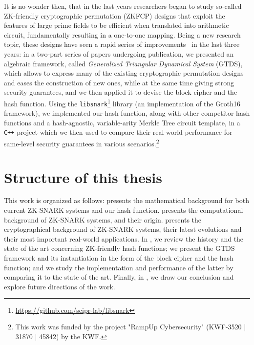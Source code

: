 It is no wonder then, that in the last years researchers began to study so-called ZK-friendly 
cryptographic permutation (ZKFCP) designs that exploit the features of large prime fields to be 
efficient when translated into arithmetic circuit, fundamentally resulting in a one-to-one mapping.
Being a new research topic, these designs have seen a rapid series of 
improvements~\cite{AlbrechtGRRT2016,GrassiKRRS2021,GrassiHRSWW2022} in the last three years:
in a two-part series of papers undergoing publication, we presented an algebraic 
framework, called \emph{Generalized Triangular Dynamical System} (GTDS), which allows to express
many of the existing cryptographic permutation designs and eases the construction of new ones, while
at the same time giving strong security guarantees, and we then applied it to devise the \Arion{}
block cipher and the \Arionhash{} hash function.
Using the \texttt{libsnark}\footnote{\url{https://github.com/scipr-lab/libsnark}} library (an 
implementation of the Groth16 framework), we implemented our hash function, along with other 
competitor hash functions and a hash-agnostic, variable-arity Merkle Tree circuit template, in a 
\texttt{C++} project which we then used to compare their real-world performance for same-level 
security guarantees in various scenarios.\footnote{This work was funded by the project 
"RampUp Cybersecurity" (KWF-3520 | 31870 | 45842) by the KWF.}

\section*{Structure of this thesis}
This work is organized as follows:  presents the mathematical background for 
both current ZK-SNARK systems and our hash function.
 presents the computational background of ZK-SNARK systems, and their origin.
 presents the cryptographical background of ZK-SNARK systems, their latest 
evolutions and their most important real-world applications.
In , we review the history and the state of the art concerning ZK-friendly hash 
functions; we present the GTDS framework and its instantiation in the form of the \Arion{} block 
cipher and the \Arionhash{} hash function; and we study the implementation and performance 
of the latter by comparing it to the state of the art. 
Finally, in , we draw our conclusion and explore future directions of the 
work.
